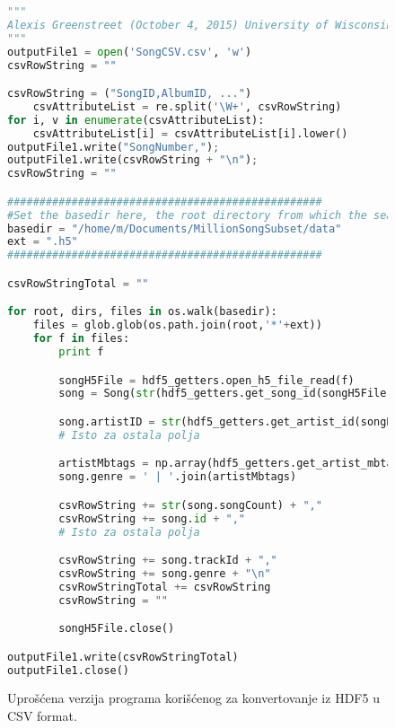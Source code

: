 \begin{figure}[H]
\lstset{style=mystyle}
\begin{lstlisting}[language=Python, basicstyle=\footnotesize]
"""
Alexis Greenstreet (October 4, 2015) University of Wisconsin-Madison
"""
outputFile1 = open('SongCSV.csv', 'w')
csvRowString = ""

csvRowString = ("SongID,AlbumID, ...")
	csvAttributeList = re.split('\W+', csvRowString)
for i, v in enumerate(csvAttributeList):
    csvAttributeList[i] = csvAttributeList[i].lower()
outputFile1.write("SongNumber,");
outputFile1.write(csvRowString + "\n");
csvRowString = ""

#################################################
#Set the basedir here, the root directory from which the search
basedir = "/home/m/Documents/MillionSongSubset/data"
ext = ".h5"
#################################################

csvRowStringTotal = ""

for root, dirs, files in os.walk(basedir):
    files = glob.glob(os.path.join(root,'*'+ext))
    for f in files:
        print f

        songH5File = hdf5_getters.open_h5_file_read(f)
        song = Song(str(hdf5_getters.get_song_id(songH5File)))

        song.artistID = str(hdf5_getters.get_artist_id(songH5File))
        # Isto za ostala polja

        artistMbtags = np.array(hdf5_getters.get_artist_mbtags(songH5File))
        song.genre = ' | '.join(artistMbtags)

        csvRowString += str(song.songCount) + ","
        csvRowString += song.id + ","
        # Isto za ostala polja

        csvRowString += song.trackId + ","
        csvRowString += song.genre + "\n"
        csvRowStringTotal += csvRowString
        csvRowString = ""

        songH5File.close()

outputFile1.write(csvRowStringTotal)
outputFile1.close()
\end{lstlisting}
\label{code:ConvertToCSV}
\caption{Upro\v{s}\'c{}ena verzija programa kori\v{s}\'c{}enog za konvertovanje iz HDF5 u CSV format.}
\end{figure}
